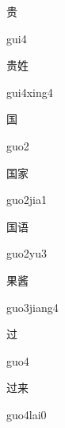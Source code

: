 \begin{verbete}[gui4]{贵}
\begin{pronuncia}{gui4}
\end{pronuncia}
\end{verbete}

\begin{verbete}{贵姓}
\begin{pronuncia}{gui4xing4}
\end{pronuncia}
\end{verbete}

\begin{verbete}[guo2]{国}
\begin{pronuncia}{guo2}
\end{pronuncia}
\end{verbete}

\begin{verbete}{国家}
\begin{pronuncia}{guo2jia1}
\end{pronuncia}
\end{verbete}

\begin{verbete}[guo2yu3]{国语}
\begin{pronuncia}{guo2yu3}
\end{pronuncia}
\end{verbete}

\begin{verbete}{果酱}
\begin{pronuncia}{guo3jiang4}
\end{pronuncia}
\end{verbete}

\begin{verbete}[guo4]{过}
\begin{pronuncia}{guo4}
\end{pronuncia}
\end{verbete}

\begin{verbete}{过来}
\begin{pronuncia}{guo4lai0}
\end{pronuncia}
\end{verbete}

